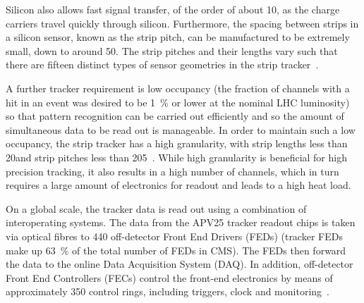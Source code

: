 Silicon also allows fast signal transfer, of the order of about 10\ns, as the charge carriers travel quickly
through silicon. Furthermore, the spacing between strips in a silicon sensor, known as the strip pitch, can be
manufactured to be extremely small, down to around 50\um. The strip pitches and their lengths vary such that
there are fifteen distinct types of sensor geometries in the strip
tracker~\cite{Commissioning_and_Performance_Strip_Tracker}.

A further tracker requirement is low occupancy (the fraction of channels with a hit in an event was desired to
be 1~\% or lower at the nominal LHC luminosity) so that pattern recognition can be carried out efficiently and
so the amount of simultaneous data to be read out is manageable. In order to maintain such a low occupancy,
the strip tracker has a high granularity, with strip lengths less than 20\cm and strip pitches less than
205\um~\cite{Palmonari:1260970}. While high granularity is beneficial for high precision tracking, it also
results in a high number of channels, which in turn requires a large amount of electronics for readout and
leads to a high heat load.

On a global scale, the tracker data is read out using a combination of interoperating systems.
The data from the APV25 tracker readout chips is taken via optical fibres to 440
off-detector Front End Drivers (FEDs) (tracker FEDs make up 63~\% of the total number of FEDs in CMS).
The FEDs then forward the data to the online Data Acquisition System (DAQ). In addition, off-detector Front
End Controllers (FECs) control the front-end electronics by means of approximately 350 control rings,
including triggers, clock and monitoring~\cite{CMS_experiment, Corrin}.



